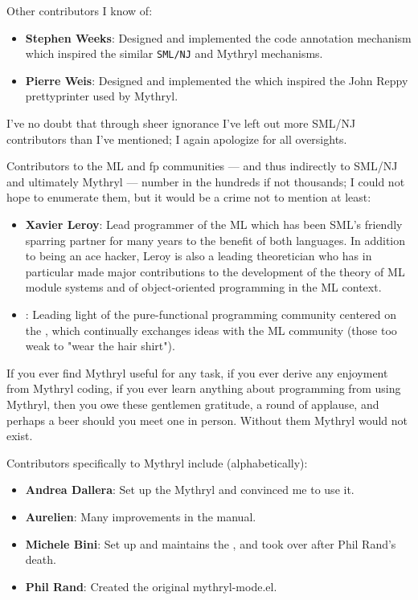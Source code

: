 Other contributors I know of: 
\begin{itemize}
\item {\bf Stephen Weeks}: Designed and implemented the  code annotation mechanism which inspired the similar {\tt SML/NJ} and Mythryl mechanisms.
\item {\bf Pierre Weis}: Designed and implemented the  which inspired the John Reppy prettyprinter used by Mythryl.
\end{itemize}

I've no doubt that through sheer ignorance I've left out more SML/NJ 
contributors than I've mentioned; I again apologize for all oversights.

Contributors to the {\sc ML} and fp communities --- and thus indirectly to 
{\sc SML/NJ} and ultimately Mythryl --- number in the hundreds if not 
thousands;  I could 
not hope to enumerate them, but it would be a crime not to mention 
at least:
\begin{itemize}
\item {\bf Xavier Leroy}: Lead programmer of the  {\sc ML}  
which has been {\sc SML}'s friendly sparring partner for many years to the benefit of both languages.  In addition 
to being an ace hacker, Leroy is also a leading theoretician who has in particular made major contributions to the 
development of the theory of {\sc ML} module systems and of object-oriented programming in the {\sc ML} context. 
\item {}: Leading light of the pure-functional programming community 
centered on the , which continually exchanges ideas with the 
{\sc ML} community (those too weak to "wear the hair shirt").
\end{itemize}

If you ever find Mythryl useful for any task, if you ever derive 
any enjoyment from Mythryl coding, if you ever learn 
anything about programming from using Mythryl, then 
you owe these gentlemen gratitude, a round of applause, 
and perhaps a beer should you meet one in person.  Without them 
Mythryl would not exist.

Contributors specifically to Mythryl include (alphabetically):
\begin{itemize}
\item {\bf Andrea Dallera}: Set up the Mythryl  and convinced me to use it.
\item {\bf Aurelien}: Many improvements in the manual.
\item {\bf Michele Bini}: Set up and maintains the , and took over \ahref{\mythrylmode} after Phil Rand's death.
\item {\bf Phil Rand}: Created the original mythryl-mode.el.
\end{itemize}